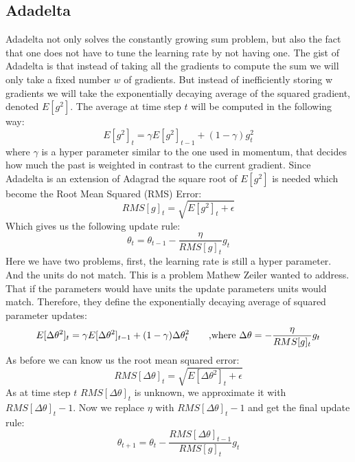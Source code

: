 \subsection{Adadelta}\label{ssec:adadelta}
Adadelta \cite{adadelta} not only solves the constantly growing sum problem, but also the fact that one does not have to tune the learning rate by not having one. The gist of Adadelta is that instead of taking all the gradients to compute the sum we will only take a fixed number $w$ of gradients. But instead of inefficiently storing w gradients we will take the exponentially decaying average of the squared gradient, denoted $E[g^{2}]$. The average at time step $t$ will be computed in the following way:
\begin{equation}
E[g^2]_t = \gamma E[g^2]_{t-1} + (1 - \gamma) g^2_t
\end{equation}
where $\gamma$ is a hyper parameter similar to the one used in momentum, that decides how much the past is weighted in contrast to the current gradient. Since Adadelta is an extension of Adagrad the square root of $E[g^{2}]$ is needed which become the Root Mean Squared (RMS) Error:
\begin{equation}
RMS[g]_t = \sqrt{E[g^2]_t + \epsilon}
\end{equation}
Which gives us the following update rule:
\begin{equation}
\theta_t = \theta_{t-1} - \frac{\eta}{RMS[g]_t}g_t
\end{equation}
Here we have two problems, first, the learning rate is still a hyper parameter. And the units do not match. This is a problem Mathew Zeiler wanted to address. That if the parameters would have units the update parameters units would match.
Therefore, they define the exponentially decaying average of squared parameter updates:
\begin{equation}
E[\Delta \theta^2]_t = \gamma E[\Delta \theta^2]_{t-1} + (1 - \gamma) \Delta \theta^2_t \ \ \ \ \ \ \hfill \text{,where } \Delta \theta = - \frac{\eta}{RMS[g]_t}g_t
\end{equation}
As before we can know us the root mean squared error:
\begin{equation}
RMS[\Delta \theta]_{t} = \sqrt{E[\Delta \theta^2]_t + \epsilon}
\end{equation}
As at time step $t$ $RMS[\Delta \theta]_{t} $ is unknown, we approximate it with $ RMS[\Delta \theta]_{t}-1$. Now we replace $\eta$ with $ RMS[\Delta \theta]_{t}-1$ and get the final update rule:
\begin{equation}
\theta_{t+1} = \theta_t - \dfrac{RMS[\Delta \theta]_{t-1}}{RMS[g]_{t}} g_{t}
\end{equation}

